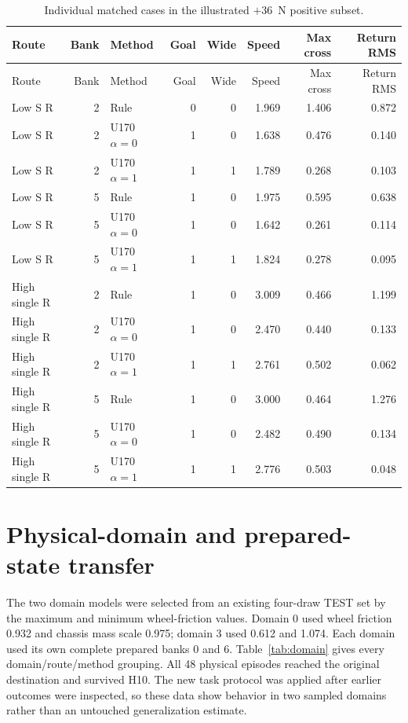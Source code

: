 \documentclass[11pt,a4paper]{article}
\begin{document}
\begin{longtable}{lrlrrrrr}
\caption{Individual matched cases in the illustrated $+36$~N positive subset.\label{tab:positive}}\\
\toprule
Route & Bank & Method & Goal & Wide & Speed & Max cross & Return RMS \\
\midrule
\endfirsthead
\toprule
Route & Bank & Method & Goal & Wide & Speed & Max cross & Return RMS \\
\midrule
\endhead
Low S R & 2 & Rule & 0 & 0 & 1.969 & 1.406 & 0.872 \\
Low S R & 2 & U170 $\alpha=0$ & 1 & 0 & 1.638 & 0.476 & 0.140 \\
Low S R & 2 & U170 $\alpha=1$ & 1 & 1 & 1.789 & 0.268 & 0.103 \\
Low S R & 5 & Rule & 1 & 0 & 1.975 & 0.595 & 0.638 \\
Low S R & 5 & U170 $\alpha=0$ & 1 & 0 & 1.642 & 0.261 & 0.114 \\
Low S R & 5 & U170 $\alpha=1$ & 1 & 1 & 1.824 & 0.278 & 0.095 \\
High single R & 2 & Rule & 1 & 0 & 3.009 & 0.466 & 1.199 \\
High single R & 2 & U170 $\alpha=0$ & 1 & 0 & 2.470 & 0.440 & 0.133 \\
High single R & 2 & U170 $\alpha=1$ & 1 & 1 & 2.761 & 0.502 & 0.062 \\
High single R & 5 & Rule & 1 & 0 & 3.000 & 0.464 & 1.276 \\
High single R & 5 & U170 $\alpha=0$ & 1 & 0 & 2.482 & 0.490 & 0.134 \\
High single R & 5 & U170 $\alpha=1$ & 1 & 1 & 2.776 & 0.503 & 0.048 \\
\bottomrule
\end{longtable}

\section{Physical-domain and prepared-state transfer}
The two domain models were selected from an existing four-draw TEST set by the maximum and minimum wheel-friction values. Domain 0 used wheel friction 0.932 and chassis mass scale 0.975; domain 3 used 0.612 and 1.074. Each domain used its own complete prepared banks 0 and 6. Table~\ref{tab:domain} gives every domain/route/method grouping. All 48 physical episodes reached the original destination and survived H10. The new task protocol was applied after earlier outcomes were inspected, so these data show behavior in two sampled domains rather than an untouched generalization estimate.
\end{document}
